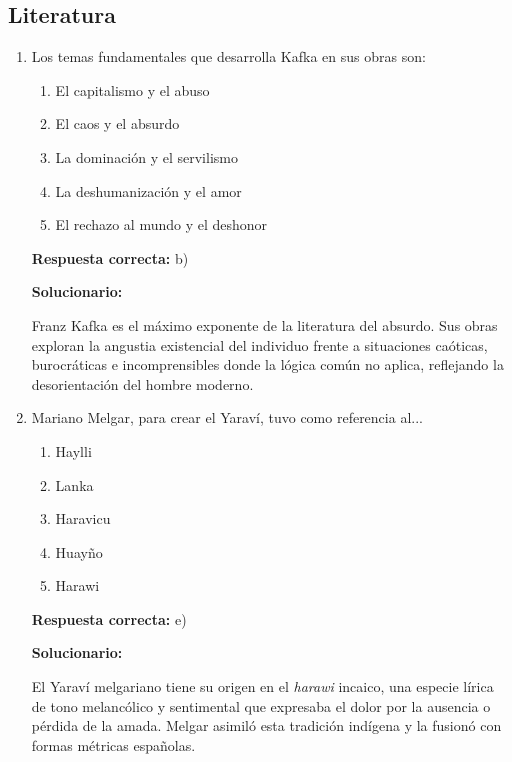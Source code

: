 \subsection*{Literatura}

\begin{enumerate}[resume]
	
	\item Los temas fundamentales que desarrolla Kafka en sus obras son:
	
	\begin{enumerate}[label=\alph*)]
		\item El capitalismo y el abuso
		\item El caos y el absurdo
		\item La dominación y el servilismo
		\item La deshumanización y el amor
		\item El rechazo al mundo y el deshonor
	\end{enumerate}
	
	\textbf{Respuesta correcta:} b)
	
	\vspace{2mm}
	\textbf{Solucionario:}
	
	Franz Kafka es el máximo exponente de la literatura del absurdo. Sus obras exploran la angustia existencial del individuo frente a situaciones caóticas, burocráticas e incomprensibles donde la lógica común no aplica, reflejando la desorientación del hombre moderno.
	
	\vspace{6mm}
	
	\item Mariano Melgar, para crear el Yaraví, tuvo como referencia al...
	
	\begin{enumerate}[label=\alph*)]
		\item Haylli
		\item Lanka
		\item Haravicu
		\item Huayño
		\item Harawi
	\end{enumerate}
	
	\textbf{Respuesta correcta:} e)
	
	\vspace{2mm}
	\textbf{Solucionario:}
	
	El Yaraví melgariano tiene su origen en el \textit{harawi} incaico, una especie lírica de tono melancólico y sentimental que expresaba el dolor por la ausencia o pérdida de la amada. Melgar asimiló esta tradición indígena y la fusionó con formas métricas españolas.
	
	\vspace{6mm}
	
\end{enumerate}







